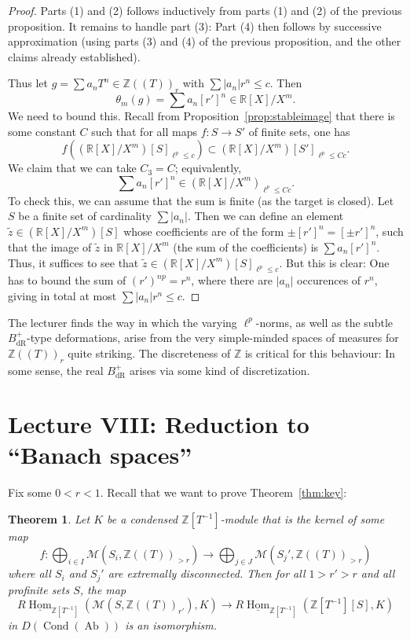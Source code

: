 \documentclass[11pt]{amsbook}
\DeclareMathOperator{\Hom}{Hom}
\newcommand{\intHom}{\underline{\Hom}}
\DeclareMathOperator{\Cond}{Cond}
\DeclareMathOperator{\Ab}{Ab}
\renewcommand*{\tilde}{\widetilde}
\numberwithin{equation}{section}
\newtheorem{theorem}{Theorem}
\numberwithin{theorem}{section}
\theoremstyle{definition}
\begin{document}
\begin{proof} Parts (1) and (2) follows inductively from parts (1) and (2) of the previous proposition. It remains to handle part (3): Part (4) then follows by successive approximation (using parts (3) and (4) of the previous proposition, and the other claims already established).

Thus let $g=\sum a_n T^n\in \mathbb Z((T))_r$ with $\sum |a_n|r^n\leq c$. Then
\[
\theta_m(g)=\sum a_n [r']^n\in \mathbb R[X]/X^m.
\]
We need to bound this. Recall from Proposition~\ref{prop:stableimage} that there is some constant $C$ such that for all maps $f: S\to S'$ of finite sets, one has
\[
f((\mathbb R[X]/X^m)[S]_{\ell^p\leq c})\subset (\mathbb R[X]/X^m)[S']_{\ell^p\leq Cc}.
\]
We claim that we can take $C_3=C$; equivalently,
\[
\sum a_n [r']^n\in (\mathbb R[X]/X^m)_{\ell^p\leq Cc}.
\]
To check this, we can assume that the sum is finite (as the target is closed). Let $S$ be a finite set of cardinality $\sum |a_n|$. Then we can define an element $\tilde{z}\in (\mathbb R[X]/X^m)[S]$ whose coefficients are of the form $\pm [r']^n=[\pm r']^n$, such that the image of $\tilde{z}$ in $\mathbb R[X]/X^m$ (the sum of the coefficients) is $\sum a_n [r']^n$. Thus, it suffices to see that $\tilde{z}\in (\mathbb R[X]/X^m)[S]_{\ell^p\leq c}$. But this is clear: One has to bound the sum of $(r')^{np}=r^n$, where there are $|a_n|$ occurences of $r^n$, giving in total at most $\sum |a_n|r^n\leq c$.
\end{proof}

The lecturer finds the way in which the varying $\ell^p$-norms, as well as the subtle $B_{\mathrm{dR}}^+$-type deformations, arise from the very simple-minded spaces of measures for $\mathbb Z((T))_r$ quite striking. The discreteness of $\mathbb Z$ is critical for this behaviour: In some sense, the real $B_{\mathrm{dR}}^+$ arises via some kind of discretization.


\newpage

\section{Lecture VIII: Reduction to ``Banach spaces''}

Fix some $0<r<1$. Recall that we want to prove Theorem~\ref{thm:key}:

\begin{theorem}\label{thm:keyrestated} Let $K$ be a condensed $\mathbb Z[T^{-1}]$-module that is the kernel of some map
\[
f: \bigoplus_{i\in I} \mathcal M(S_i,\mathbb Z((T))_{>r})\to \bigoplus_{j\in J} \mathcal M(S_j',\mathbb Z((T))_{>r})
\]
where all $S_i$ and $S_j'$ are extremally disconnected. Then for all $1>r'>r$ and all profinite sets $S$, the map
\[
R\intHom_{\mathbb Z[T^{-1}]}(\mathcal M(S,\mathbb Z((T))_{r'}),K)\to R\intHom_{\mathbb Z[T^{-1}]}(\mathbb Z[T^{-1}][S],K)
\]
in $D(\Cond(\Ab))$ is an isomorphism.
\end{theorem}
\end{document}
